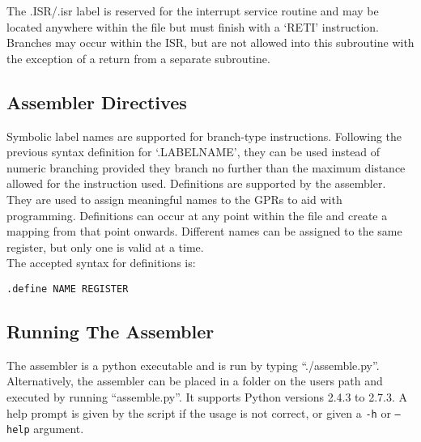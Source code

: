 \noindent The .ISR/.isr label is reserved for the interrupt service routine and may be located anywhere within the file but must finish with a `RETI' instruction.%
Branches may occur within the ISR, but are not allowed into this subroutine with the exception of a return from a separate subroutine.\\

\subsection{Assembler Directives}
Symbolic label names are supported for branch-type instructions. Following the previous syntax definition for `.LABELNAME', they can be used instead of numeric branching provided they branch no further than the maximum distance allowed for the instruction used. 
Definitions are supported by the assembler. 
They are used to assign meaningful names to the GPRs to aid with programming.
Definitions can occur at any point within the file and create a mapping from that point onwards. 
Different names can be assigned to the same register, but only one is valid at a time. \\


\noindent The accepted syntax for definitions is:

\begin{center}\texttt{.define NAME REGISTER}\end{center}

\subsection{Running The Assembler}\label{sect:runningassembler}

The assembler is a python executable and is run by typing ``./assemble.py''. 
Alternatively, the assembler can be placed in a folder on the users path and executed by running ``assemble.py''.
It supports Python versions 2.4.3 to 2.7.3.
A help prompt is given by the script if the usage is not correct, or given a \texttt{-h} or \texttt{--help} argument. 

